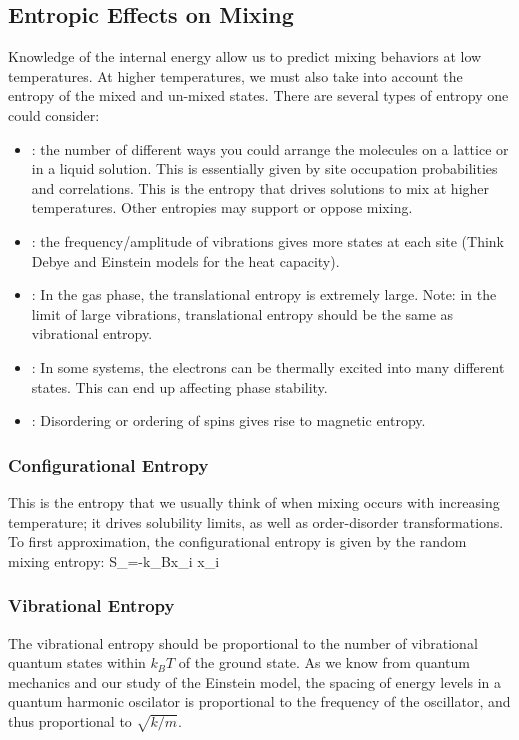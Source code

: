 \documentclass[12pt]{article}
\begin{document}
\subsection{Entropic Effects on Mixing}
Knowledge of the internal energy allow us to predict mixing behaviors at low temperatures. At higher temperatures, we must also take into account the entropy of the mixed and un-mixed states. There are several types of entropy one could consider:
\begin{itemize}
\item {}: the number of different ways you could arrange the molecules on a lattice or in a liquid solution. This is essentially given by site occupation probabilities and correlations. This is the entropy that drives solutions to mix at higher temperatures. Other entropies may support or oppose mixing.
\item {}: the frequency/amplitude of vibrations gives more states at each site (Think Debye and Einstein models for the heat capacity).
\item {}: In the gas phase, the translational entropy is extremely large. Note: in the limit of large vibrations, translational entropy should be the same as vibrational entropy.
\item {}: In some systems, the electrons can be thermally excited into many different states. This can end up affecting phase stability.
\item {}: Disordering or ordering of spins gives rise to magnetic entropy.
\end{itemize} 

\subsubsection{Configurational Entropy}
This is the entropy that we usually think of when mixing occurs with increasing temperature; it drives solubility limits, as well as order-disorder transformations. To first approximation, the configurational entropy is given by the random mixing entropy:
\eqs S_{}=-k_B\sum x_i \ln x_i \eqe

\subsubsection{Vibrational Entropy}
The vibrational entropy should be proportional to the number of vibrational quantum states within $k_B T$ of the ground state. As we know from quantum mechanics and our study of the Einstein model, the spacing of energy levels in a quantum harmonic oscilator is proportional to the frequency of the oscillator, and thus proportional to $ \sqrt{k/m}$.
\end{document}
